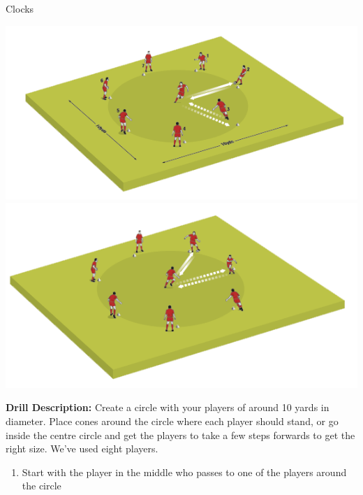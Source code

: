 \begin{evenBlock}{Clocks}

\begin{minipage}[t]{\linewidth}
    \centering
    
    \begin{minipage}{.3\linewidth} %
        \centering
        \includegraphics[width=\textwidth]{../img/Trimmed/Clocks1}
        \vspace{12pt}
        \includegraphics[width=\textwidth]{../img/Trimmed/Clocks2}
    \end{minipage}
    \hspace{0.05\linewidth}
    \begin{minipage}{.6\linewidth} %
        \textbf{Drill Description:}
        Create a circle with your players of around 10 yards in diameter. Place cones around the circle where each player should stand, or go inside the centre circle and get the players to take a few steps forwards to get the right size. We’ve used eight players.
        \begin{enumerate}
        \setlength{\itemsep}{0pt}
        \setlength{\parskip}{0pt}
        \setlength{\parsep}{0pt}
        \item Start with the player in the middle who passes to one of the players around the circle

\end{enumerate}
\end{minipage}
\end{minipage}
\end{evenBlock}
